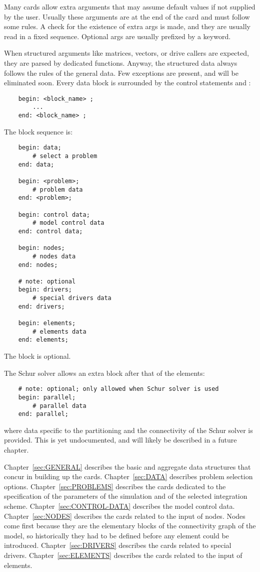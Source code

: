 Many cards allow extra arguments that may assume default values 
if not supplied by the user. 
Usually these arguments are at the end of the card
and must follow some rules. 
A check for the existence of extra args is made,
and they are usually read in a fixed sequence.
Optional args are usually prefixed by a keyword.

When structured arguments like matrices, vectors, or drive callers are
expected, they are parsed by dedicated functions.
Anyway, the structured data always follows the rules of the general data. 
Few exceptions are present, and will be eliminated soon.
Every data block is surrounded by the control statements  and
:
\begin{verbatim}
    begin: <block_name> ;
        ...
    end: <block_name> ;
\end{verbatim}
The block sequence is:
\begin{verbatim}
    begin: data;
        # select a problem
    end: data;

    begin: <problem>;
        # problem data
    end: <problem>;

    begin: control data;
        # model control data
    end: control data;

    begin: nodes;
        # nodes data
    end: nodes;

    # note: optional
    begin: drivers;
        # special drivers data
    end: drivers;

    begin: elements;
        # elements data
    end: elements;
\end{verbatim}
The  block is optional.

The Schur solver allows an extra block after that of the elements:
\begin{verbatim}
    # note: optional; only allowed when Schur solver is used
    begin: parallel;
        # parallel data
    end: parallel;
\end{verbatim}
where data specific to the partitioning and the connectivity
of the Schur solver is provided.
This is yet undocumented, and will likely be described 
in a future chapter.

Chapter~\ref{sec:GENERAL} describes the basic and aggregate
data structures that concur in building up the cards.
Chapter~\ref{sec:DATA} describes problem selection options.
Chapter~\ref{sec:PROBLEMS} describes the cards dedicated
to the specification of the parameters of the simulation
and of the selected integration scheme.
Chapter~\ref{sec:CONTROL-DATA} describes the model control data.
Chapter~\ref{sec:NODES} describes the cards related to the input
of nodes.
Nodes come first because they are the elementary blocks 
of the connectivity graph of the model, so historically 
they had to be defined before any element could be introduced.
Chapter~\ref{sec:DRIVERS} describes the cards related 
to special drivers.
Chapter~\ref{sec:ELEMENTS} describes the cards related to the input
of elements.



